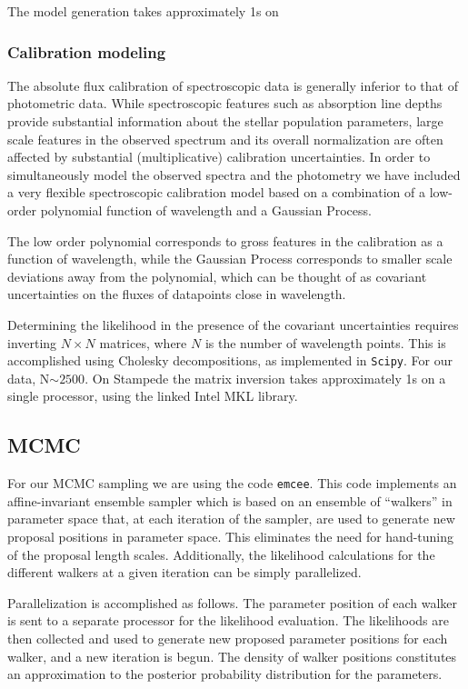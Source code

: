 \documentclass[11pt,preprint]{aastex}
\begin{document}
The model generation takes approximately 1s on 

\subsubsection{Calibration modeling}
The absolute flux calibration of spectroscopic data is generally
inferior to that of photometric data.  While spectroscopic features
such as absorption line depths provide substantial information about
the stellar population parameters, large scale features in the
observed spectrum and its overall normalization are often affected by
substantial (multiplicative) calibration uncertainties. In order to
simultaneously model the observed spectra and the photometry we have
included a very flexible spectroscopic calibration model based on a
combination of a low-order polynomial function of wavelength and a
Gaussian Process.

The low order polynomial corresponds to gross features in the
calibration as a function of wavelength, while the Gaussian Process
corresponds to smaller scale deviations away from the polynomial,
which can be thought of as covariant uncertainties on the fluxes of
datapoints close in wavelength.

Determining the likelihood in the presence of the covariant
uncertainties requires inverting $N \times N$ matrices, where $N$ is
the number of wavelength points.  This is accomplished using Cholesky
decompositions, as implemented in \texttt{Scipy}.  For our data,
N$\sim 2500$.  On Stampede the matrix inversion takes approximately 1s
on a single processor, using the linked Intel MKL library.

\subsection{MCMC}
For our MCMC sampling we are using the code \texttt{emcee}.  This code
implements an affine-invariant ensemble sampler \citep{goodman_weare}
which is based on an ensemble of ``walkers'' in parameter space that,
at each iteration of the sampler, are used to generate new proposal
positions in parameter space.  This eliminates the need for
hand-tuning of the proposal length scales.  Additionally, the
likelihood calculations for the different walkers at a given iteration
can be simply parallelized.

Parallelization is accomplished as follows. The parameter position of
each walker is sent to a separate processor for the likelihood
evaluation. The likelihoods are then collected and used to generate
new proposed parameter positions for each walker, and a new iteration
is begun.  The density of walker positions constitutes an
approximation to the posterior probability distribution for the
parameters.
\end{document}
